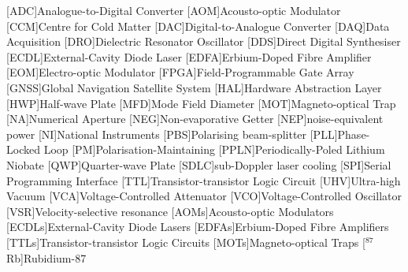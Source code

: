     \begin{acronym}
        [ADC]{Analogue-to-Digital Converter}
        [AOM]{Acousto-optic Modulator}
        [CCM]{Centre for Cold Matter}
        [DAC]{Digital-to-Analogue Converter}
        [DAQ]{Data Acquisition}
        [DRO]{Dielectric Resonator Oscillator}
        [DDS]{Direct Digital Synthesiser}
        [ECDL]{External-Cavity Diode Laser}
        [EDFA]{Erbium-Doped Fibre Amplifier}
        [EOM]{Electro-optic Modulator}
        [FPGA]{Field-Programmable Gate Array}
        [GNSS]{Global Navigation Satellite System}
        [HAL]{Hardware Abstraction Layer}
        [HWP]{Half-wave Plate}
        [MFD]{Mode Field Diameter}
        [MOT]{Magneto-optical Trap}
        [NA]{Numerical Aperture}
        [NEG]{Non-evaporative Getter}
        [NEP]{noise-equivalent power}
        [NI]{National Instruments}
        [PBS]{Polarising beam-splitter}
        [PLL]{Phase-Locked Loop}
        [PM]{Polarisation-Maintaining}
        [PPLN]{Periodically-Poled Lithium Niobate}
        [QWP]{Quarter-wave Plate}
        [SDLC]{sub-Doppler laser cooling}
        [SPI]{Serial Programming Interface}
        [TTL]{Transistor-transistor Logic Circuit}
        [UHV]{Ultra-high Vacuum}
        [VCA]{Voltage-Controlled Attenuator}
        [VCO]{Voltage-Controlled Oscillator}
        [VSR]{Velocity-selective resonance}
        [AOMs]{Acousto-optic Modulators}
        [ECDLs]{External-Cavity Diode Lasers}
        [EDFAs]{Erbium-Doped Fibre Amplifiers}
        [TTLs]{Transistor-transistor Logic Circuits}
        [MOTs]{Magneto-optical Traps}
        [\(^{87}\)Rb]{Rubidium-87}
    \end{acronym}

